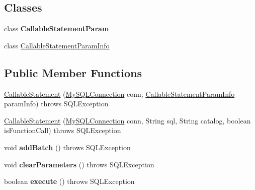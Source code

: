 \subsection*{Classes}
\begin{DoxyCompactItemize}
\item 
class {\bfseries Callable\+Statement\+Param}
\item 
class \mbox{\hyperlink{classcom_1_1mysql_1_1jdbc_1_1_callable_statement_1_1_callable_statement_param_info}{Callable\+Statement\+Param\+Info}}
\end{DoxyCompactItemize}
\subsection*{Public Member Functions}
\begin{DoxyCompactItemize}
\item 
\mbox{\hyperlink{classcom_1_1mysql_1_1jdbc_1_1_callable_statement_afe23a2502823ac5641c8541a642a5e82}{Callable\+Statement}} (\mbox{\hyperlink{interfacecom_1_1mysql_1_1jdbc_1_1_my_s_q_l_connection}{My\+S\+Q\+L\+Connection}} conn, \mbox{\hyperlink{classcom_1_1mysql_1_1jdbc_1_1_callable_statement_1_1_callable_statement_param_info}{Callable\+Statement\+Param\+Info}} param\+Info)  throws S\+Q\+L\+Exception 
\item 
\mbox{\hyperlink{classcom_1_1mysql_1_1jdbc_1_1_callable_statement_add848c7958a17fa7459a677996f3a371}{Callable\+Statement}} (\mbox{\hyperlink{interfacecom_1_1mysql_1_1jdbc_1_1_my_s_q_l_connection}{My\+S\+Q\+L\+Connection}} conn, String sql, String catalog, boolean is\+Function\+Call)  throws S\+Q\+L\+Exception 
\item 
\mbox{\label{classcom_1_1mysql_1_1jdbc_1_1_callable_statement_acb80697bb10fb15a699bc9f4abf95b2c}} 
void {\bfseries add\+Batch} ()  throws S\+Q\+L\+Exception 
\item 
\mbox{\label{classcom_1_1mysql_1_1jdbc_1_1_callable_statement_a9d309e9b84920feeb0dcd8d9bcc0d032}} 
void {\bfseries clear\+Parameters} ()  throws S\+Q\+L\+Exception 
\item 
\mbox{\label{classcom_1_1mysql_1_1jdbc_1_1_callable_statement_a2bdcebe7608fc04a46399f4cafc57dce}} 
boolean {\bfseries execute} ()  throws S\+Q\+L\+Exception 
\item 

\end{DoxyCompactItemize}
